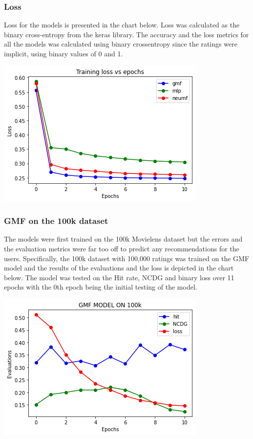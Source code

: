 \documentclass{article}
\begin{document}
\subsubsection{Loss}
Loss for the models is presented in the chart below. Loss was calculated as the binary cross-entropy from the keras library. The accuracy and the loss metrics for all the models was calculated using binary crossentropy since the ratings were implicit, using binary values of 0 and 1. \\
\begin{center}
\includegraphics[scale=0.5]{loss}
\end{center}

\subsubsection{GMF on the 100k dataset}
 The models were first trained on the 100k Movielens dataset but the errors and the evaluation metrics were far too off to predict any recommendations for the users. Specifically, the 100k dataset with 100,000 ratings was trained on the GMF model and the results of the evaluations and the loss is depicted in the chart below.
The model was tested on the Hit rate, NCDG and binary loss over 11 epochs with the 0th epoch being the initial testing of the model. \\
\begin{center}
\includegraphics[scale=0.5]{gmf100k}
\end{center}
\end{document}
